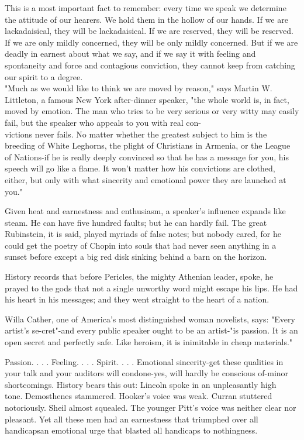 \documentclass[10pt]{article}
\begin{document}
This is a most important fact to remember: every time we speak we determine the attitude of our hearers. We hold them in the hollow of our hands. If we are lackadaisical, they will be lackadaisical. If we are reserved, they will be reserved. If we are only mildly concerned, they will be only mildly concerned. But if we are deadly in earnest about what we say, and if we say it with feeling and spontaneity and force and contagious conviction, they cannot keep from catching our spirit to a degree.\\
"Much as we would like to think we are moved by reason," says Martin W. Littleton, a famous New York after-dinner speaker, "the whole world is, in fact, moved by emotion. The man who tries to be very serious or very witty may easily fail, but the speaker who appeals to you with real con-\\
victions never fails. No matter whether the greatest subject to him is the breeding of White Leghorns, the plight of Christians in Armenia, or the League of Nations-if he is really deeply convinced so that he has a message for you, his speech will go like a flame. It won't matter how his convictions are clothed, either, but only with what sincerity and emotional power they are launched at you."

Given heat and earnestness and enthusiasm, a speaker's influence expands like steam. He can have five hundred faults; but he can hardly fail. The great Rubinstein, it is said, played myriads of false notes; but nobody cared, for he could get the poetry of Chopin into souls that had never seen anything in a sunset before except a big red disk sinking behind a barn on the horizon.

History records that before Pericles, the mighty Athenian leader, spoke, he prayed to the gods that not a single unworthy word might escape his lips. He had his heart in his messages; and they went straight to the heart of a nation.

Willa Cather, one of America's most distinguished woman novelists, says: "Every artist's se-cret"-and every public speaker ought to be an artist-"is passion. It is an open secret and perfectly safe. Like heroism, it is inimitable in cheap materials."

Passion. . . . Feeling. . . . Spirit. . . . Emotional sincerity-get these qualities in your talk and your auditors will condone-yes, will hardly be conscious of-minor shortcomings. History bears this out: Lincoln spoke in an unpleasantly high\\
tone. Demosthenes stammered. Hooker's voice was weak. Curran stuttered notoriously. Sheil almost squealed. The younger Pitt's voice was neither clear nor pleasant. Yet all these men had an earnestness that triumphed over all handicapsan emotional urge that blasted all handicaps to nothingness.
\end{document}
